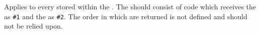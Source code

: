 \documentclass[oneside]{book}
\begin{document}

\begin{function}{\propVarMapInline}
\begin{syntax}
  
\end{syntax}
Applies  to every  stored
within the . The  should
consist of code which receives the  as \verb|#1| and the
 as \verb|#2|.
The order in which  are returned is not defined and
should not be relied upon.
\begin{demohigh}
\IgnoreSpacesOn
\propSetFromKeyval {}
\tlClear \lTmpaTl
\propVarMapInline {}
\tlUse \lTmpaTl
\IgnoreSpacesOff
\end{demohigh}
\end{function}

\end{document}
